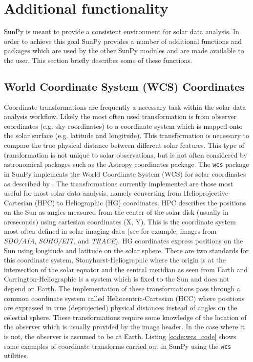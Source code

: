 \section{Additional functionality}\label{sec:util}
SunPy is meant to provide a consistent environment for solar data analysis. In 
order to achieve this goal SunPy provides a number of additional functions and packages which 
are used by the other SunPy modules and are made available to the user. This section 
briefly describes some of these functions.

	
\subsection{World Coordinate System (WCS) Coordinates}\label{ssec:util:wcs}
Coordinate transformations are frequently a necessary task within the solar 
data analysis workflow. Likely the most often used transformation is from 
observer coordinates (e.g. sky coordinates) to a coordinate system which is 
mapped onto the solar surface (e.g. latitude and longitude). This 
transformation is necessary to compare the true physical distance between 
different solar features. This type of transformation is not unique
to solar observations, but is not often considered by astronomical packages
such as the Astropy 
coordinates package. The \verb|wcs| package in SunPy implements the World Coordinate 
System (WCS) for solar coordinates as described by \cite{Thompson2000}. The 
transformations currently implemented are those most useful 
for most solar data analysis, namely converting from Helioprojective-Cartesian 
(HPC) to Heliographic (HG) coordinates. HPC describes the positions on 
the Sun as angles measured from the center of the solar disk (usually in 
arcseconds) using cartesian coordinates (X, Y). This is the coordinate system 
most often defined in solar imaging data (see for example, images from 
\textit{SDO/AIA}, \textit{SOHO/EIT}, and \textit{TRACE}). 
HG coordinates express positions on the Sun using longitude and latitude on 
the solar sphere. There are two standards for this coordinate system, 
Stonyhurst-Heliographic where the origin is at the intersection of the solar 
equator and the central meridian as seen from Earth and 
Carrington-Heliographic is a system which is fixed to the Sun and does not depend on Earth. The 
implementation of these transformations pass through a common coordinate system 
called Heliocentric-Cartesian (HCC) where positions are expressed in true 
(deprojected) physical distances instead of angles on the celestial sphere.
These transformations require some knowledge of the location of the observer 
which is usually provided by the image header. In the case where it is 
not, the observer is assumed to be at Earth. Listing \ref{code:wcs_code} shows 
some examples of coordinate transforms carried out in SunPy using the 
\verb|wcs| utilities. 

